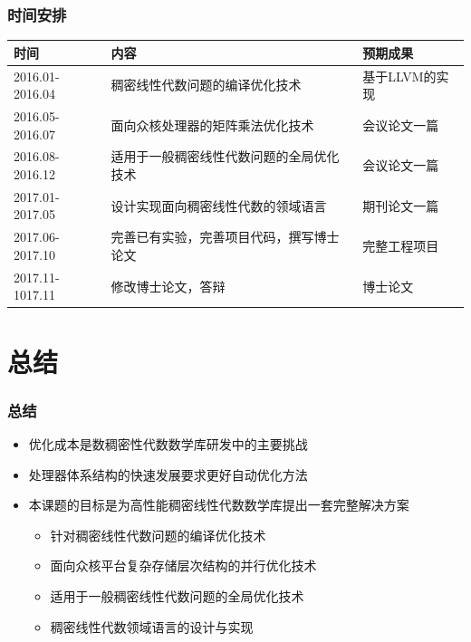 \documentclass[aspectratio=169]{beamer}
\begin{document}
\begin{frame}
  \frametitle{时间安排}
  \begin{table}
    \footnotesize{
    \begin{tabular}{l|p{}|l}
      \hline
      \textbf{时间}   & \textbf{内容}                            & \textbf{预期成果} \\
      \hline
      2016.01-2016.04 & 稠密线性代数问题的编译优化技术           & 基于LLVM的实现 \\
      2016.05-2016.07 & 面向众核处理器的矩阵乘法优化技术         & 会议论文一篇 \\
      2016.08-2016.12 & 适用于一般稠密线性代数问题的全局优化技术 & 会议论文一篇 \\
      2017.01-2017.05 & 设计实现面向稠密线性代数的领域语言       & 期刊论文一篇 \\
      2017.06-2017.10 & 完善已有实验，完善项目代码，撰写博士论文 & 完整工程项目 \\
      2017.11-1017.11 & 修改博士论文，答辩                       & 博士论文 \\
      \hline
    \end{tabular}}
  \end{table}
\end{frame}

\section*{总结}

\begin{frame}
  \frametitle{总结}
  \begin{itemize}
    \item 优化成本是数稠密性代数数学库研发中的主要挑战
    \item 处理器体系结构的快速发展要求更好自动优化方法
    \item 本课题的目标是为高性能稠密线性代数数学库提出一套完整解决方案
      \begin{itemize}
      \item 针对稠密线性代数问题的编译优化技术
      \item 面向众核平台复杂存储层次结构的并行优化技术
      \item 适用于一般稠密线性代数问题的全局优化技术
      \item 稠密线性代数领域语言的设计与实现
      \end{itemize}
  \end{itemize}
\end{frame}
\end{document}
